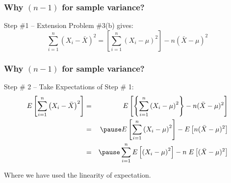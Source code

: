 \begin{frame}
\frametitle{Why $(n-1)$ for sample variance?}
\begin{block}{Step \#1 -- Extension Problem \#3(b) gives:}
	$$\sum_{i=1}^n \left(X_i - \bar{X}\right)^2 = \left[  \sum_{i=1}^n \left(X_i - \mu\right)^2\right] - n(\bar{X}-\mu)^2$$
\end{block}

\end{frame}
%

\begin{frame}
\frametitle{Why $(n-1)$ for sample variance?}
\begin{block}{Step \# 2 -- Take Expectations of Step \# 1:}
	\begin{eqnarray*}
		E\left[\sum_{i=1}^n \left(X_i - \bar{X}\right)^2\right] &=& E\left[\left\{  \sum_{i=1}^n \left(X_i - \mu\right)^2\right\} - n(\bar{X}-\mu)^2\right]\\
			&=&\pause E\left[ \sum_{i=1}^n \left(X_i - \mu\right)^2\right] -E\left[ n(\bar{X}-\mu)^2\right]\\
			&=&\pause  \sum_{i=1}^n E\left[\left(X_i - \mu\right)^2\right] -n\;E\left[ (\bar{X}-\mu)^2\right]\\
	\end{eqnarray*}
\end{block}
\alert{Where we have used the linearity of expectation.}
\end{frame}


